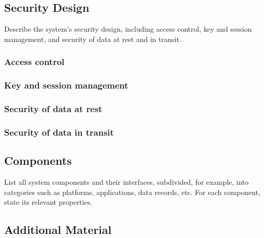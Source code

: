 \documentclass[english]{article}
\begin{document}
\subsection{Security Design}\label{ssec:security_design}

Describe the system's security design, including access control, key and session management,  and security of data at rest and in transit.

\subsubsection{Access control}
\subsubsection{Key and session management}
\subsubsection{Security of data at rest}
\subsubsection{Security of data in transit}

\subsection{Components}\label{ssec:components}

List all system components and their interfaces, subdivided, for example, into
  categories such as platforms, applications, data records, etc. For
  each component, state its relevant properties.



\subsection{Additional Material}
\end{document}

